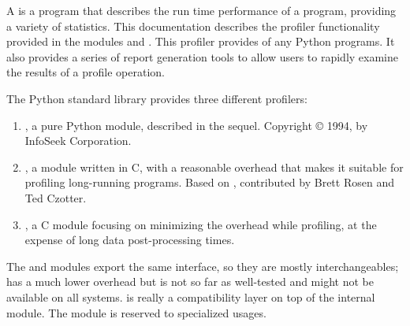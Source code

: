 A  is a program that describes the run time performance
of a program, providing a variety of statistics.  This documentation
describes the profiler functionality provided in the modules
 and .  This profiler provides
 of any Python programs.  It also
provides a series of report generation tools to allow users to rapidly
examine the results of a profile operation.

The Python standard library provides three different profilers:

\begin{enumerate}
\item {}, a pure Python module, described in the sequel.
  Copyright \copyright{} 1994, by InfoSeek Corporation.

\item {}, a module written in C, with a reasonable
  overhead that makes it suitable for profiling long-running programs.
  Based on , contributed by Brett Rosen and Ted Czotter.

\item {}, a C module focusing on minimizing the overhead
  while profiling, at the expense of long data post-processing times.
\end{enumerate}

The  and  modules export the same
interface, so they are mostly interchangeables;  has a
much lower overhead but is not so far as well-tested and might not be
available on all systems.   is really a compatibility
layer on top of the internal  module.  The
 module is reserved to specialized usages.

